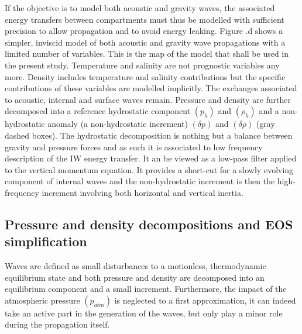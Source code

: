 \documentclass[a4paper,11pt]{article}
\begin{document}
If the objective is to model both acoustic and gravity waves, the associated energy transfers between compartments must thus be modelled with sufficient precision to allow propagation and to avoid energy leaking. Figure .d shows a simpler, inviscid model of both acoustic and gravity wave propagations with a limited number of variables. This is the map of the model that shall be used in the present study. Temperature and salinity are not prognostic variables any more. Density includes temperature and salinity contributions but the specific contributions of these variables are modelled implicitly. The exchanges associated to acoustic, internal and surface waves remain. Pressure and density are further decomposed into a reference hydrostatic component $(p_h)$ and $(\rho_h)$ and a non-hydrostatic anomaly (a non-hydrostatic increment) $(\delta p)$ and $(\delta\rho)$ (gray dashed boxes). The hydrostatic decomposition is nothing but a balance between gravity and pressure forces and as such it is associated to low frequency description of the IW energy transfer. It an be viewed as a low-pass filter applied to the vertical momentum equation. It provides a short-cut for a slowly evolving component of internal waves and the non-hydrostatic increment is then the high-frequency increment involving both horizontal and vertical inertia.\\

\subsection{Pressure and density decompositions and EOS simplification}
\label{SubSectionPRHO}

Waves are defined as small disturbances to a motionless, thermodynamic equilibrium state and both pressure and density are decomposed into an equilibrium component and a small increment. Furthermore, the impact of the atmospheric pressure $(p_{atm})$ is neglected to a first approximation, it can indeed take an active part in the generation of the waves, but only play a minor role during the propagation itself. 
\end{document}

